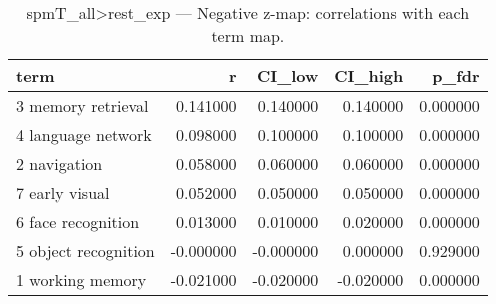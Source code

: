 \begin{table}
\caption{spmT_all>rest_exp — Negative z-map: correlations with each term map.}
\label{tab:spmT_all>rest_exp_neg}
\begin{tabular}{lrrrr}
\toprule
term & r & CI\_low & CI\_high & p\_fdr \\
\midrule
3 memory retrieval & 0.141000 & 0.140000 & 0.140000 & 0.000000 \\
4 language network & 0.098000 & 0.100000 & 0.100000 & 0.000000 \\
2 navigation & 0.058000 & 0.060000 & 0.060000 & 0.000000 \\
7 early visual & 0.052000 & 0.050000 & 0.050000 & 0.000000 \\
6 face recognition & 0.013000 & 0.010000 & 0.020000 & 0.000000 \\
5 object recognition & -0.000000 & -0.000000 & 0.000000 & 0.929000 \\
1 working memory & -0.021000 & -0.020000 & -0.020000 & 0.000000 \\
\bottomrule
\end{tabular}
\end{table}
